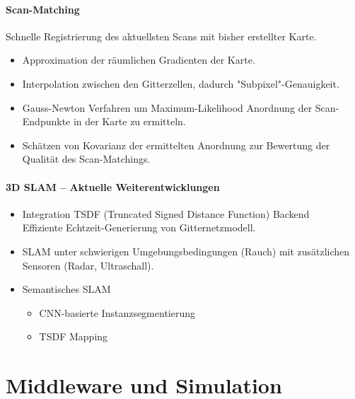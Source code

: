 			\subsubsection{Scan-Matching}
				Schnelle Registrierung des aktuellsten Scans mit bisher erstellter Karte.
				\begin{itemize}
					\item Approximation der räumlichen Gradienten der Karte.
					\item Interpolation zwischen den Gitterzellen, dadurch "Subpixel"-Genauigkeit.
					\item Gauss-Newton Verfahren um Maximum-Likelihood Anordnung der Scan-Endpunkte in der Karte zu ermitteln.
					\item Schätzen von Kovarianz der ermittelten Anordnung zur Bewertung der Qualität des Scan-Matchings.
				\end{itemize}

			\subsubsection{3D SLAM -- Aktuelle Weiterentwicklungen}
				\begin{itemize}
					\item Integration TSDF (Truncated Signed Distance Function) Backend \\ Effiziente Echtzeit-Generierung von Gitternetzmodell.
					\item SLAM unter schwierigen Umgebungsbedingungen (\zB Rauch) mit zusätzlichen Sensoren (\zB Radar, Ultraschall).
					\item Semantisches SLAM
						\begin{itemize}
							\item CNN-basierte Instanzsegmentierung
							\item TSDF Mapping
						\end{itemize}
				\end{itemize}

\chapter{Middleware und Simulation}
